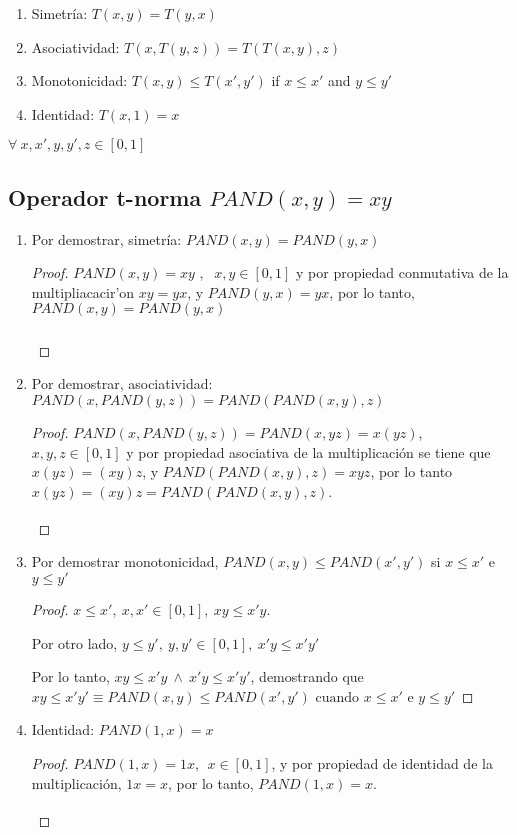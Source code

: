 \documentclass[letterpaper,spanish,11pt]{article}
\begin{document}
\begin{enumerate}
\item Simetr\'{i}a: $T(x,y)=T(y,x)$
\item Asociatividad: $T(x,T(y,z))=T(T(x,y),z)$
\item Monotonicidad: $T(x,y) \leq T(x',y')$ if $x\leq x'$ and $y\leq y'$
\item Identidad: $T(x,1)=x$
\end{enumerate}
$\forall \ x,x',y,y',z \in [0,1]$

\subsection{Operador t-norma $PAND(x,y)=xy$}
\begin{enumerate}
\item Por demostrar, simetr\'{i}a: $PAND(x,y)=PAND(y,x)$

\begin{proof}

$PAND(x,y)=xy$ , $\ \ x,y \in [0,1]$ y por propiedad conmutativa de la multipliacacir'{o}n $xy=yx$, y $PAND(y,x)=yx$, por lo tanto, $PAND(x,y)=PAND(y,x)$

\[\qedhere\]
\end{proof}

\item Por demostrar, asociatividad:  $PAND(x,PAND(y,z))=PAND(PAND(x,y),z)$
\begin{proof}
$PAND(x,PAND(y,z))=PAND(x,yz)=x(yz)$,  $x,y,z \in [0,1]$ y por propiedad
asociativa de la multiplicaci\'{o}n se tiene que $x(yz) = (xy)z$,  y
$PAND(PAND(x,y),z)=xyz$, por lo tanto $x(yz)=(xy)z=PAND(PAND(x,y),z)$.
\[\qedhere\]
\end{proof}

\item Por demostrar monotonicidad, $PAND(x,y) \leq PAND(x',y')$ si $x\leq x'$ e $y\leq y'$
\begin{proof}
$x \leq x', \ x,x' \in [0,1], \ xy \leq  x'y$. 

Por otro lado, $y \leq y', \  y,y' \in [0,1], \  x'y \leq x'y'$

Por lo tanto, $xy \leq  x'y \ \wedge \  x'y \leq x'y'$, demostrando que $xy \leq x'y' \equiv PAND(x,y) \leq PAND(x',y') \text{ cuando } x\leq x'$ e $y\leq y'$ 
\end{proof}

\item Identidad: $PAND(1,x)=x$

\begin{proof}
$PAND(1,x)=1x, \ \ x \in [0,1]$, y por propiedad de identidad de la multiplicaci\'{o}n, $1x=x$,   por lo tanto, $PAND(1,x)=x$.
\[\qedhere\]
\end{proof}


\end{enumerate}
\end{document}

